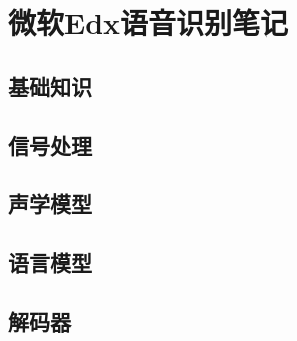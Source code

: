 \chapter{微软Edx语音识别笔记}
\section{基础知识}

\section{信号处理}


\section{声学模型}


\section{语言模型}


\section{解码器}